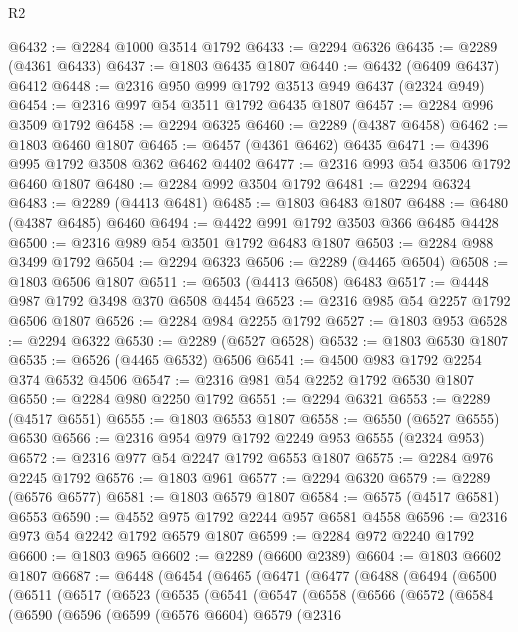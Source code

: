 \begin{lexlean}{R2}
\begin{coremodule}
@6432 := @2284 @1000 @3514 @1792
@6433 := @2294 @6326
@6435 := @2289 (@4361 @6433)
@6437 := @1803 @6435 @1807
@6440 := @6432 (@6409 @6437) @6412
@6448 := @2316 @950 @999 @1792 @3513 @949 @6437 (@2324 @949)
@6454 := @2316 @997 @54 @3511 @1792 @6435 @1807
@6457 := @2284 @996 @3509 @1792
@6458 := @2294 @6325
@6460 := @2289 (@4387 @6458)
@6462 := @1803 @6460 @1807
@6465 := @6457 (@4361 @6462) @6435
@6471 := @4396 @995 @1792 @3508 @362 @6462 @4402
@6477 := @2316 @993 @54 @3506 @1792 @6460 @1807
@6480 := @2284 @992 @3504 @1792
@6481 := @2294 @6324
@6483 := @2289 (@4413 @6481)
@6485 := @1803 @6483 @1807
@6488 := @6480 (@4387 @6485) @6460
@6494 := @4422 @991 @1792 @3503 @366 @6485 @4428
@6500 := @2316 @989 @54 @3501 @1792 @6483 @1807
@6503 := @2284 @988 @3499 @1792
@6504 := @2294 @6323
@6506 := @2289 (@4465 @6504)
@6508 := @1803 @6506 @1807
@6511 := @6503 (@4413 @6508) @6483
@6517 := @4448 @987 @1792 @3498 @370 @6508 @4454
@6523 := @2316 @985 @54 @2257 @1792 @6506 @1807
@6526 := @2284 @984 @2255 @1792
@6527 := @1803 @953
@6528 := @2294 @6322
@6530 := @2289 (@6527 @6528)
@6532 := @1803 @6530 @1807
@6535 := @6526 (@4465 @6532) @6506
@6541 := @4500 @983 @1792 @2254 @374 @6532 @4506
@6547 := @2316 @981 @54 @2252 @1792 @6530 @1807
@6550 := @2284 @980 @2250 @1792
@6551 := @2294 @6321
@6553 := @2289 (@4517 @6551)
@6555 := @1803 @6553 @1807
@6558 := @6550 (@6527 @6555) @6530
@6566 := @2316 @954 @979 @1792 @2249 @953 @6555 (@2324 @953)
@6572 := @2316 @977 @54 @2247 @1792 @6553 @1807
@6575 := @2284 @976 @2245 @1792
@6576 := @1803 @961
@6577 := @2294 @6320
@6579 := @2289 (@6576 @6577)
@6581 := @1803 @6579 @1807
@6584 := @6575 (@4517 @6581) @6553
@6590 := @4552 @975 @1792 @2244 @957 @6581 @4558
@6596 := @2316 @973 @54 @2242 @1792 @6579 @1807
@6599 := @2284 @972 @2240 @1792
@6600 := @1803 @965
@6602 := @2289 (@6600 @2389)
@6604 := @1803 @6602 @1807
@6687 := @6448
    (@6454
      (@6465
        (@6471
          (@6477
            (@6488
              (@6494
                (@6500
                  (@6511
                    (@6517
                      (@6523
                        (@6535
                          (@6541
                            (@6547
                              (@6558
                                (@6566
                                  (@6572
                                    (@6584
                                      (@6590
                                        (@6596
                                          (@6599
                                            (@6576 @6604)
                                            @6579
                                            (@2316

\end{coremodule}
\end{lexlean}

